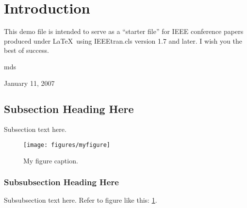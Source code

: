 \section{Introduction}
This demo file is intended to serve as a ``starter file''
for IEEE conference papers produced under \LaTeX\ using
IEEEtran.cls version 1.7 and later.
I wish you the best of success.

\hfill mds
 
\hfill January 11, 2007

\subsection{Subsection Heading Here}
Subsection text here.

\begin{figure}[h]
\centering
\texttt{[image: figures/myfigure]}
\caption{My figure caption.}
\label{fig_ref}
\end{figure}
\subsubsection{Subsubsection Heading Here}
Subsubsection text here. Refer to figure like this: \figurename \ref{fig_ref}.

